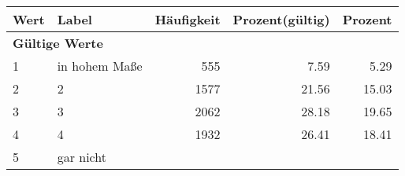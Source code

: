      \begin{longtable}{lXrrr}
     \toprule
     \textbf{Wert} & \textbf{Label} & \textbf{Häufigkeit} & \textbf{Prozent(gültig)} & \textbf{Prozent} \\
     \endhead
     \midrule
     \multicolumn{5}{l}{\textbf{Gültige Werte}}\\

     1 &
     \multicolumn{1}{X}{ in hohem Maße   } &


       \num{555} &
       \num[round-mode=places,round-precision=2]{7,59} &
         \num[round-mode=places,round-precision=2]{5,29} \\

     2 &
     \multicolumn{1}{X}{ 2   } &


       \num{1577} &
       \num[round-mode=places,round-precision=2]{21,56} &
         \num[round-mode=places,round-precision=2]{15,03} \\

     3 &
     \multicolumn{1}{X}{ 3   } &


       \num{2062} &
       \num[round-mode=places,round-precision=2]{28,18} &
         \num[round-mode=places,round-precision=2]{19,65} \\

     4 &
     \multicolumn{1}{X}{ 4   } &


       \num{1932} &
       \num[round-mode=places,round-precision=2]{26,41} &
         \num[round-mode=places,round-precision=2]{18,41} \\

     5 &
     \multicolumn{1}{X}{ gar nicht   } &



\end{longtable}
